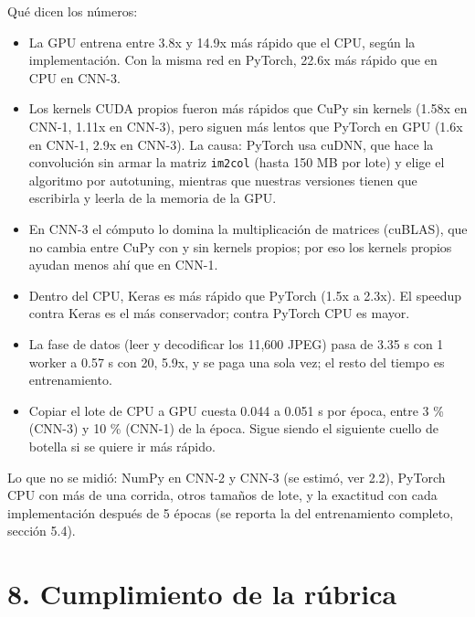 \documentclass[
  11pt,
]{article}
\providecommand{\tightlist}{%
  \setlength{\itemsep}{0pt}\setlength{\parskip}{0pt}}
\begin{document}
Qué dicen los números:
\begin{itemize}
\tightlist
\item La GPU entrena entre 3.8x y 14.9x más rápido que el CPU, según la implementación. Con la misma red en PyTorch, 22.6x más rápido que en CPU en CNN-3.
\item Los kernels CUDA propios fueron más rápidos que CuPy sin kernels (1.58x en CNN-1, 1.11x en CNN-3), pero siguen más lentos que PyTorch en GPU
  (1.6x en CNN-1, 2.9x en CNN-3). La causa: PyTorch usa cuDNN, que hace la convolución sin armar la matriz \texttt{im2col} (hasta 150 MB por lote) y
  elige el algoritmo por autotuning, mientras que nuestras versiones tienen que escribirla y leerla de la memoria de la GPU.
\item En CNN-3 el cómputo lo domina la multiplicación de matrices (cuBLAS), que no cambia entre CuPy con y sin kernels propios; por eso los kernels propios ayudan menos ahí que en CNN-1.
\item Dentro del CPU, Keras es más rápido que PyTorch (1.5x a 2.3x). El speedup contra Keras es el más conservador; contra PyTorch CPU es mayor.
\item La fase de datos (leer y decodificar los 11,600 JPEG) pasa de 3.35 s con 1 worker a 0.57 s con 20, 5.9x, y se paga una sola vez; el resto del tiempo es entrenamiento.
\item Copiar el lote de CPU a GPU cuesta 0.044 a 0.051 s por época, entre 3 \% (CNN-3) y 10 \% (CNN-1) de la época. Sigue siendo el siguiente cuello de botella si se quiere ir más rápido.
\end{itemize}

Lo que no se midió: NumPy en CNN-2 y CNN-3 (se estimó, ver 2.2), PyTorch CPU con más de una corrida, otros tamaños de lote, y la exactitud con
cada implementación después de 5 épocas (se reporta la del entrenamiento completo, sección 5.4).

\clearpage
\section{8. Cumplimiento de la rúbrica}\label{verificacion-rubrica}
\end{document}
